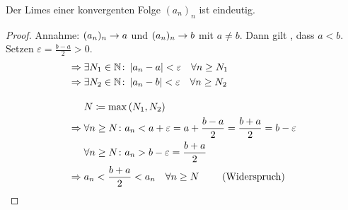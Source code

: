 \begin{satz}
    Der Limes einer konvergenten Folge $(a_n)_n$ ist eindeutig.
    \begin{proof}
        Annahme: $(a_n)_n\rightarrow{} a$ und $(a_n)_n\rightarrow{} b$ mit  $a\neq b$. Dann gilt \OBDA, dass $a<b$. Setzen $\varepsilon = \frac{b-a}{2} > 0$.
        \begin{align*}
            \Rightarrow{} &\exists N_1 \in\mathbb{N}\colon \left|a_n-a\right| < \varepsilon \quad \forall n\geq N_1\\
            \Rightarrow{} &\exists N_2 \in\mathbb{N}\colon \left|a_n-b\right| < \varepsilon \quad \forall n\geq N_2\\[10pt]
            &N\coloneqq \max\left(N_1, N_2\right)\\
            \Rightarrow{} &\forall n\geq N\colon a_n < a+\varepsilon = a + \frac{b-a}{2} = \frac{b+a}{2} = b-\varepsilon\\
            &\forall n\geq N\colon a_n > b-\varepsilon = \frac{b+a}{2}\\
            \Rightarrow{} &a_n <\frac{b+a}{2} < a_n \quad \forall n\geq N\qquad\text{ (Widerspruch)}\qedhere
        \end{align*}
    \end{proof}
\end{satz}

